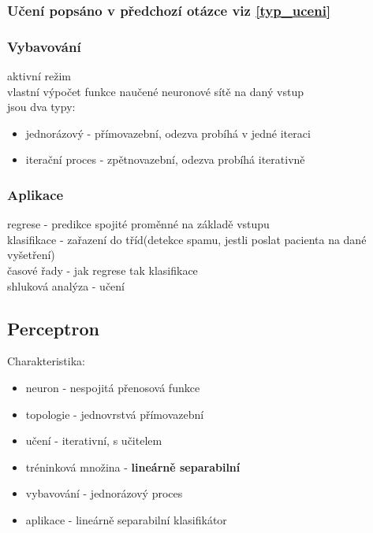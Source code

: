 \subsubsection{Učení popsáno v předchozí otázce viz \ref{typ_uceni}}

\subsubsection{Vybavování}
aktivní režim\\
vlastní výpočet funkce naučené neuronové sítě na daný vstup\\
jsou dva typy:
\begin{itemize}
    \item jednorázový - přímovazební, odezva probíhá v jedné iteraci
    \item iterační proces - zpětnovazební, odezva probíhá iterativně
\end{itemize}

\subsubsection{Aplikace}
regrese - predikce spojité proměnné na základě vstupu\\
klasifikace - zařazení do tříd(detekce spamu, jestli poslat pacienta na dané vyšetření)\\
časové řady - jak regrese tak klasifikace\\
shluková analýza - učení

\subsection{Perceptron}
Charakteristika:
\begin{itemize}
    \item neuron - nespojitá přenosová funkce
    \item topologie - jednovrstvá přímovazební
    \item učení - iterativní, s učitelem
    \item tréninková množina - \textbf{lineárně separabilní}
    \item vybavování - jednorázový proces
    \item aplikace - lineárně separabilní klasifikátor
\end{itemize}
